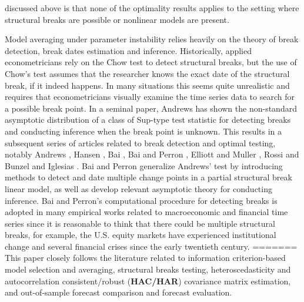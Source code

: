 discussed above is that none of the optimality results applies to the setting where structural breaks are possible or nonlinear models are present.

Model averaging under parameter instability relies heavily on the theory of break detection, break dates estimation and inference. Historically, applied econometricians rely on the Chow test to detect structural breaks, but the use of Chow's test assumes that the researcher knows the exact date of the structural break, if it indeed happens. In many situations this seems quite unrealistic and requires that econometricians visually examine the time series data to search for a possible break point. In a seminal paper, Andrews \cite{andrews93} has shown the non-standard asymptotic distribution of a class of Sup-type test statistic for detecting breaks and conducting inference when the break point is unknown. This results in a subsequent series of articles related to break detection and optimal testing, notably Andrews \cite{andrews_ploberger94} \cite{andrews2003}, Hansen \cite{hansen_JE2000}, Bai \cite{bai_ET1997} \cite{bai_JE1999}, Bai and Perron \cite{bai_perron98}, Elliott and Muller \cite{elliott_muller_RES2006}, Rossi \cite{rossi_ET2005} and Bunzel and Iglesias \cite{bunzel_iglesias}. Bai and Perron \cite{bai_perron98} generalize Andrews' test by introducing methods to detect and date multiple change points in a partial structural break linear model, as well as develop relevant asymptotic theory for conducting inference. Bai and Perron's computational procedure for detecting breaks is adopted in many empirical works related to macroeconomic and financial time series since it is reasonable to think that there could be multiple structural breaks, for example, the U.S. equity markets have experienced institutional change and several financial crises since the early twentieth century.
=======
This paper closely follows the literature related to information criterion-based model selection and averaging, structural breaks testing, heteroscedasticity and autocorrelation consistent/robust (\textbf{HAC/HAR}) covariance matrix estimation, and out-of-sample forecast comparison and forecast evaluation.

